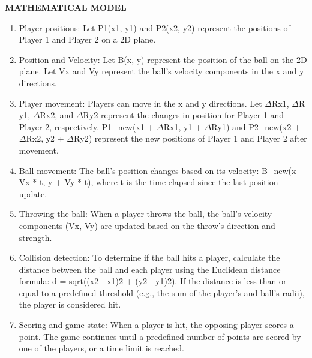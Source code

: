 \documentclass[12pt]{report}
\begin{document}
\large\textbf{MATHEMATICAL MODEL}
\normalsize
\justifying
\setlength{\parindent}{4em}
\setlength{\parskip}{0.5em}
\renewcommand{\baselinestretch}{1.5}
\vspace{0.1cm}
\begin{enumerate}
\item Player positions:
Let P1(x1, y1) and P2(x2, y2) represent the positions of Player 1 and Player 2 on a 2D plane.

\item Position and Velocity:
Let B(x, y) represent the position of the ball on the 2D plane.
Let Vx and Vy represent the ball's velocity components in the x and y directions.

\item Player movement:
Players can move in the x and y directions. Let $\Delta\mathrm{R}$x1, $\Delta\mathrm{R}$y1, $\Delta\mathrm{R}$x2, and $\Delta\mathrm{R}$y2 represent the changes in position for Player 1 and Player 2, respectively.
P1\_new(x1 + $\Delta\mathrm{R}$x1, y1 + $\Delta\mathrm{R}$y1) and P2\_new(x2 + $\Delta\mathrm{R}$x2, y2 + $\Delta\mathrm{R}$y2) represent the new positions of Player 1 and Player 2 after movement.

\item Ball movement:
The ball's position changes based on its velocity: B\_new(x + Vx * t, y + Vy * t), where t is the time elapsed since the last position update.

\item Throwing the ball:
When a player throws the ball, the ball's velocity components (Vx, Vy) are updated based on the throw's direction and strength.

\item Collision detection:
To determine if the ball hits a player, calculate the distance between the ball and each player using the Euclidean distance formula: d = sqrt((x2 - x1)\^2 + (y2 - y1)\^2).
If the distance is less than or equal to a predefined threshold (e.g., the sum of the player's and ball's radii), the player is considered hit.

\item Scoring and game state:
When a player is hit, the opposing player scores a point.
The game continues until a predefined number of points are scored by one of the players, or a time limit is reached.


\end{enumerate}


\clearpage

\centering
\end{document}
